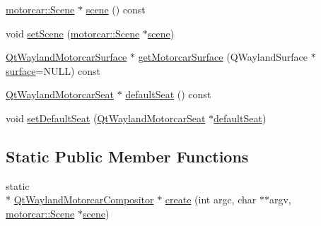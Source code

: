 \begin{DoxyCompactItemize}
\item 
\hyperlink{classmotorcar_1_1Scene}{motorcar\-::\-Scene} $\ast$ \hyperlink{classqtmotorcar_1_1QtWaylandMotorcarCompositor_a8bb6c8e6a7acad99b814b192534f3ee2}{scene} () const 
\item 
void \hyperlink{classqtmotorcar_1_1QtWaylandMotorcarCompositor_a2a896748e415515de155c22ef70adeb0}{set\-Scene} (\hyperlink{classmotorcar_1_1Scene}{motorcar\-::\-Scene} $\ast$\hyperlink{classqtmotorcar_1_1QtWaylandMotorcarCompositor_a8bb6c8e6a7acad99b814b192534f3ee2}{scene})
\item 
\hyperlink{classqtmotorcar_1_1QtWaylandMotorcarSurface}{Qt\-Wayland\-Motorcar\-Surface} $\ast$ \hyperlink{classqtmotorcar_1_1QtWaylandMotorcarCompositor_a97c4d656c14bd2b6877405d5003fb741}{get\-Motorcar\-Surface} (Q\-Wayland\-Surface $\ast$\hyperlink{simple-egl_8c_a0720952aa1caded45b5bcdce589663a9}{surface}=N\-U\-L\-L) const 
\item 
\hyperlink{classqtmotorcar_1_1QtWaylandMotorcarSeat}{Qt\-Wayland\-Motorcar\-Seat} $\ast$ \hyperlink{classqtmotorcar_1_1QtWaylandMotorcarCompositor_a6104791cebeec6529ec784db17096a38}{default\-Seat} () const 
\item 
void \hyperlink{classqtmotorcar_1_1QtWaylandMotorcarCompositor_a6ea6591a5e3999156f7418f8a61db992}{set\-Default\-Seat} (\hyperlink{classqtmotorcar_1_1QtWaylandMotorcarSeat}{Qt\-Wayland\-Motorcar\-Seat} $\ast$\hyperlink{classqtmotorcar_1_1QtWaylandMotorcarCompositor_a6104791cebeec6529ec784db17096a38}{default\-Seat})
\end{DoxyCompactItemize}
\subsection*{Static Public Member Functions}
\begin{DoxyCompactItemize}
\item 
static \\*
\hyperlink{classqtmotorcar_1_1QtWaylandMotorcarCompositor}{Qt\-Wayland\-Motorcar\-Compositor} $\ast$ \hyperlink{classqtmotorcar_1_1QtWaylandMotorcarCompositor_a169e428e534906108290bb5c4512ca13}{create} (int argc, char $\ast$$\ast$argv, \hyperlink{classmotorcar_1_1Scene}{motorcar\-::\-Scene} $\ast$\hyperlink{classqtmotorcar_1_1QtWaylandMotorcarCompositor_a8bb6c8e6a7acad99b814b192534f3ee2}{scene})
\end{DoxyCompactItemize}
